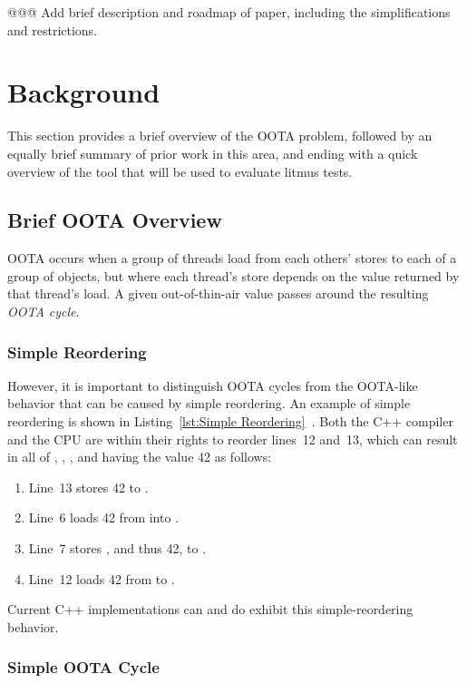 \documentclass[10]{article}
\begin{document}
@@@ Add brief description and roadmap of paper, including the simplifications
and restrictions.

\section{Background}
\label{sec:Background}

This section provides a brief overview of the OOTA problem, followed
by an equally brief summary of prior work in this area, and ending
with a quick overview of the  tool that will be used to
evaluate litmus tests.

\subsection{Brief OOTA Overview}
\label{sec:Brief OOTA Overview}

OOTA occurs when a group of threads load from each others' stores to
each of a group of objects, but where each thread's store depends on
the value returned by that thread's load.
A given out-of-thin-air value passes around the resulting \emph{OOTA cycle}.

\subsubsection{Simple Reordering}
\label{sec:Simple Reordering}

However, it is important to distinguish OOTA cycles from the OOTA-like
behavior that can be caused by simple reordering.
An example of simple reordering is shown in
Listing~\ref{lst:Simple Reordering}~\cite{PaulEMcKenney2020RelaxedGuideRelaxed}.
Both the C++ compiler and the CPU are within their rights to reorder
lines~12 and~13, which can result in all of , , ,
and  having the value 42 as follows:

\begin{enumerate}
\item   Line~13 stores 42 to .
\item   Line~6 loads 42 from  into .
\item   Line~7 stores , and thus 42, to .
\item   Line~12 loads 42 from  to .
\end{enumerate}

Current C++ implementations can and do exhibit this simple-reordering
behavior.

\subsubsection{Simple OOTA Cycle}
\label{sec:Simple OOTA Cycle}
\end{document}
